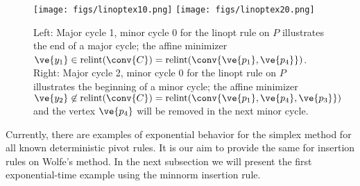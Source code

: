 \begin{figure}[ht]
 \texttt{[image: figs/linoptex10.png]} \texttt{[image: figs/linoptex20.png]}
 \caption{Left: Major cycle 1, minor cycle 0 for the linopt rule on $P$ illustrates the end of a major cycle; the affine minimizer $\ve{y_1} \in \text{relint}(\conv\{C\}) = \text{relint}(\conv\{\ve{p_1},\ve{p_4}\})$.  Right: Major cycle 2, minor cycle 0 for the linopt rule on $P$ illustrates the beginning of a minor cycle; the affine minimizer $\ve{y_2} \not\in \text{relint}(\conv\{C\}) = \text{relint}(\conv\{\ve{p_1},\ve{p_4},\ve{p_3}\})$ and the vertex $\ve{p_4}$ will be removed in the next minor cycle.}
 \label{ex:1steps} 
\end{figure}

\fi

Currently, there are examples of exponential behavior for the simplex method for all known deterministic pivot rules. 
It is our aim to provide the same for insertion rules on Wolfe's method.
In the next subsection we will present the first  exponential-time example using the minnorm insertion rule.


